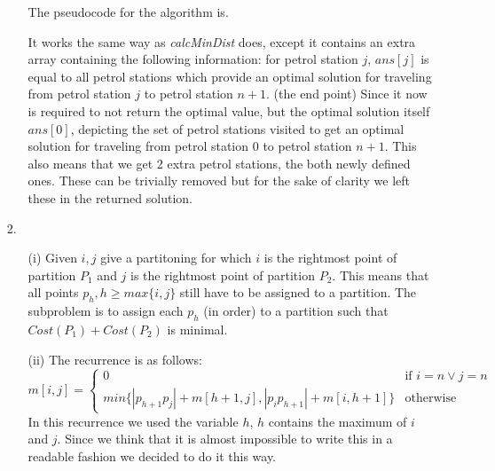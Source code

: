 \documentclass{article}
\begin{document}
\begin{itemize}
\begin{itemize}
The pseudocode for the algorithm is.
\begin{algorithmic}[1]
\ENDFOR
{}
		\ENDIF
	\ENDWHILE
\ENDFOR
{}
\end{algorithmic}
It works the same way as \emph{calcMinDist} does, except it contains an extra array containing the following information: for petrol station $j$, $ans[j]$ is equal to all petrol stations which provide an optimal solution for traveling from petrol station $j$ to petrol station $n+1$. (the end point) Since it now is required to not return the optimal value, but the optimal solution itself $ans[0]$, depicting the set of petrol stations visited to get an optimal solution for traveling from petrol station $0$ to petrol station $n+1$. This also means that we get 2 extra petrol stations, the both newly defined ones. These can be trivially removed but for the sake of clarity we left these in the returned solution.

\end{itemize}

\item[2.]
\begin{itemize}

\item[(i)] Given $i,j$ give a partitoning for which $i$ is the rightmost point of partition $P_1$ and $j$ is the rightmost point of partition $P_2$. This means that all points $p_h, h\ge max\{i,j\}$ still have to be assigned to a partition. The subproblem is to assign each $p_h$ (in order) to a partition such that $Cost(P_1)+Cost(P_2)$ is minimal.

\item[(ii)] The recurrence is as follows:
      \[
      m[i,j] = \left\{
                   \begin{array}{ll}
                     0   & \mbox{if $i=n \vee j=n$} \\
                     min\{|p_{h+1}p_{j}| + m[h+1,j], |p_ip_{h+1}| + m[i,h+1]\}& \text{otherwise}
                   \end{array}
                \right.
      \]
In this recurrence we used the variable $h$, $h$ contains the maximum of $i$ and $j$. Since we think that it is almost impossible to write this in a readable fashion we decided to do it this way.


\end{itemize}
\end{itemize}
\end{document}
